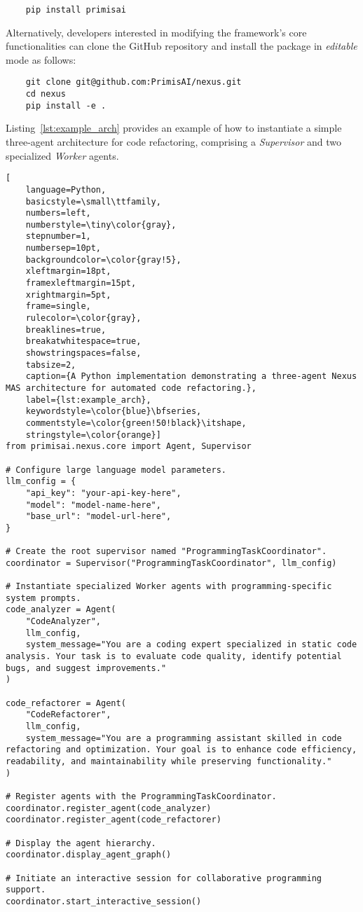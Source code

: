 \begin{verbatim}
    pip install primisai
\end{verbatim}

Alternatively, developers interested in modifying the framework's core functionalities can clone the GitHub repository and install the package in {\em editable} mode as follows:

\begin{verbatim}
    git clone git@github.com:PrimisAI/nexus.git
    cd nexus
    pip install -e .
\end{verbatim}

Listing~\ref{lst:example_arch} provides an example of how to instantiate a simple three-agent architecture for code refactoring, comprising a {\em Supervisor} and two specialized \emph{Worker} agents.

\begin{lstlisting}[
    language=Python,
    basicstyle=\small\ttfamily,
    numbers=left,
    numberstyle=\tiny\color{gray},
    stepnumber=1,
    numbersep=10pt,
    backgroundcolor=\color{gray!5},
    xleftmargin=18pt,
    framexleftmargin=15pt,
    xrightmargin=5pt,
    frame=single,
    rulecolor=\color{gray},
    breaklines=true,
    breakatwhitespace=true,
    showstringspaces=false,
    tabsize=2,
    caption={A Python implementation demonstrating a three-agent Nexus MAS architecture for automated code refactoring.},
    label={lst:example_arch},
    keywordstyle=\color{blue}\bfseries,
    commentstyle=\color{green!50!black}\itshape,
    stringstyle=\color{orange}]
from primisai.nexus.core import Agent, Supervisor

# Configure large language model parameters.
llm_config = {
    "api_key": "your-api-key-here",
    "model": "model-name-here",
    "base_url": "model-url-here",
}

# Create the root supervisor named "ProgrammingTaskCoordinator".
coordinator = Supervisor("ProgrammingTaskCoordinator", llm_config)

# Instantiate specialized Worker agents with programming-specific system prompts.
code_analyzer = Agent(
    "CodeAnalyzer",
    llm_config,
    system_message="You are a coding expert specialized in static code analysis. Your task is to evaluate code quality, identify potential bugs, and suggest improvements."
)

code_refactorer = Agent(
    "CodeRefactorer",
    llm_config,
    system_message="You are a programming assistant skilled in code refactoring and optimization. Your goal is to enhance code efficiency, readability, and maintainability while preserving functionality."
)

# Register agents with the ProgrammingTaskCoordinator.
coordinator.register_agent(code_analyzer)
coordinator.register_agent(code_refactorer)

# Display the agent hierarchy.
coordinator.display_agent_graph()

# Initiate an interactive session for collaborative programming support.
coordinator.start_interactive_session()
\end{lstlisting}

